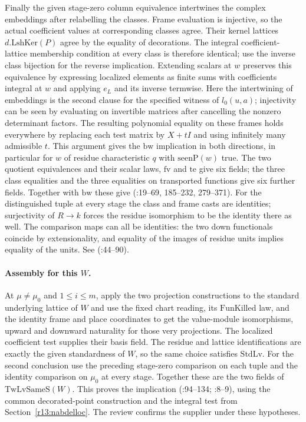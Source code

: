 Finally the given stage-zero column equivalence intertwines the complex
embeddings after relabelling the classes. Frame evaluation is injective,
so the actual coefficient values at corresponding classes agree.
Their kernel lattices $d.\mathrm{LshKer}(P)$ agree by the equality
of decorations. The integral coefficient-lattice membership condition
at every class is therefore identical; use the inverse class bijection
for the reverse implication. Extending scalars at $w$ preserves this
equivalence by expressing localized elements as finite sums with
coefficients integral at $w$ and applying $e_L$ and its inverse
termwise. Here the intertwining of embeddings is the second
clause for the specified witness of $l_0(u,a)$; injectivity can
be seen by evaluating on invertible matrices after cancelling the
nonzero determinant factors. The resulting polynomial equality on
these frames holds everywhere by replacing each test matrix by
$X+tI$ and using infinitely many admissible $t$. This argument
gives the $\mathrm{bw}$ implication in both directions, in particular
for $w$ of residue characteristic $q$ with $\mathrm{seenP}(w)$ true.
The two quotient equivalences and their scalar laws, $\mathrm{fv}$
and $\mathrm{te}$ give six fields; the three class equalities and the
three equalities on transported functions give six further fields.
Together with $\mathrm{bw}$ these give 
(:19--69, 185--232, 279--371). For the distinguished
tuple at every stage the class and frame casts are identities;
surjectivity of $R\to k$ forces the residue isomorphism to be the
identity there as well. The comparison maps can all be identities:
the two down functionals coincide by extensionality, and equality of
the images of residue units implies equality of the units. See
(:44--90).

\paragraph{Assembly for this $W$.}
At $\mu\ne\mu_0$ and $1\le i\le m$, apply the two projection
constructions to the standard underlying lattice of $W$ and use the
fixed chart reading, its $\mathrm{FunKilled}$ law, and the identity
frame and place coordinates to get the value-module isomorphisms,
upward and downward naturality for those very projections. The
localized coefficient test supplies their basis field. The residue
and lattice identifications are exactly the given standardness of
$W$, so the same choice satisfies $\mathrm{StdLv}$. For the second
conclusion use the preceding stage-zero comparison on each tuple and
the identity comparison on $\mu_0$ at every stage. Together these
are the two fields of $\mathrm{TwLvSameS}(W)$. This proves the
implication 
(:94--134;
:8--9),
using the common decorated-point construction and the integral test from
Section~\ref{r13:nabdelloc}. The review confirms the supplier under these hypotheses.

